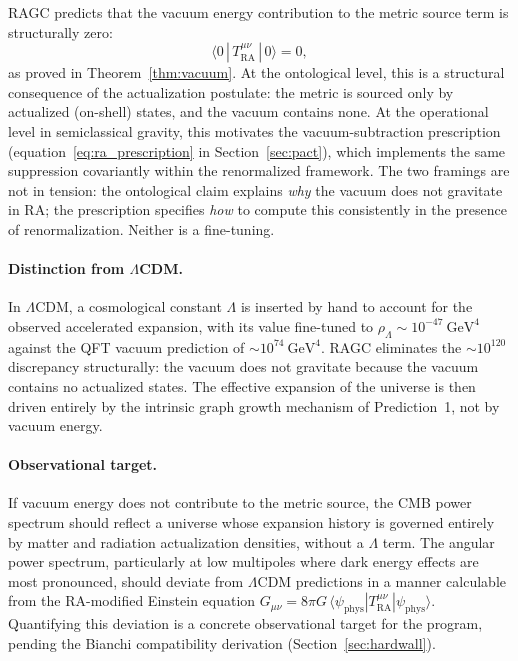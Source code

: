 \documentclass[11pt,a4paper]{article}
\theoremstyle{plain}
\theoremstyle{definition}
\theoremstyle{remark}
\newcommand{\Tact}{T^{\mu\nu}_{\mathrm{RA}}}
\begin{document}
RAGC predicts that the vacuum energy contribution to the metric source term is
structurally zero:
\begin{equation}
  \langle 0 \,|\, \Tact \,|\, 0 \rangle = 0,
\end{equation}
as proved in Theorem~\ref{thm:vacuum}. At the ontological level,
this is a structural consequence of the actualization postulate: the metric is
sourced only by actualized (on-shell) states, and the vacuum contains none.
At the operational level in semiclassical gravity, this motivates the
vacuum-subtraction prescription (equation~\eqref{eq:ra_prescription} in
Section~\ref{sec:pact}), which implements the same suppression covariantly
within the renormalized framework. The two framings are not in tension:
the ontological claim explains \emph{why} the vacuum does not gravitate in RA;
the prescription specifies \emph{how} to compute this consistently in the
presence of renormalization. Neither is a fine-tuning.

\paragraph{Distinction from $\Lambda$CDM.}
In $\Lambda$CDM, a cosmological constant $\Lambda$ is inserted by hand to account
for the observed accelerated expansion, with its value fine-tuned to $\rho_\Lambda
\sim 10^{-47}~\mathrm{GeV}^4$ against the QFT vacuum prediction of $\sim
10^{74}~\mathrm{GeV}^4$. RAGC eliminates the $\sim\!10^{120}$ discrepancy
structurally: the vacuum does not gravitate because the vacuum contains no
actualized states. The effective expansion of the universe is then driven entirely
by the intrinsic graph growth mechanism of Prediction~1, not by vacuum energy.

\paragraph{Observational target.}
If vacuum energy does not contribute to the metric source, the CMB power spectrum
should reflect a universe whose expansion history is governed entirely by matter
and radiation actualization densities, without a $\Lambda$ term. The angular power
spectrum, particularly at low multipoles where dark energy effects are most
pronounced, should deviate from $\Lambda$CDM predictions in a manner calculable
from the RA-modified Einstein equation
$G_{\mu\nu} = 8\pi G\,\langle\psi_{\mathrm{phys}}|\Tact|\psi_{\mathrm{phys}}\rangle$.
Quantifying this deviation is a concrete observational target for the program,
pending the Bianchi compatibility derivation (Section~\ref{sec:hardwall}).
\end{document}
